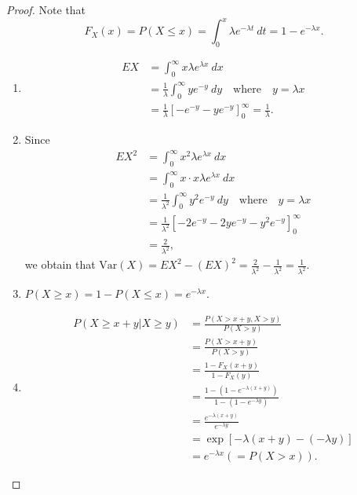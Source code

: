 \documentclass[12pt,a4paper]{article}
\theoremstyle{definition}
\theoremstyle{definition}
\theoremstyle{definition}
\theoremstyle{definition}
\theoremstyle{remark}
\theoremstyle{definition}
\newcommand{\dispsty}{\displaystyle}
\newcommand{\Var}{\text{Var}}
\begin{document}
\begin{proof}
	Note that \[
	F_X(x)=P(X\leq x)=\int_0^x\lambda e^{-\lambda t}\ dt=1-e^{-\lambda x}.
	\] \begin{enumerate}
		\item \begin{align*}
		EX&=\int_0^\infty x\lambda e^{\lambda x}\ dx\\
		&=\frac{1}{\lambda}\int_0^\infty ye^{-y}\ dy\quad\text{where}\quad y=\lambda x\\
		&=\frac{1}{\lambda}\left[-e^{-y}-ye^{-y}\right]_0^\infty=\frac{1}{\lambda}.
		\end{align*}
		\item Since \begin{align*}
		EX^2&=\int_0^\infty x^2\lambda e^{\lambda x}\ dx\\
		&=\int_0^\infty x\cdot x\lambda e^{\lambda x}\ dx \\
		&=\frac{1}{\lambda^2}\int_0^\infty y^2e^{-y}\ dy\quad\text{where}\quad y=\lambda x\\
		&=\frac{1}{\lambda^2}\left[-2e^{-y}-2ye^{-y}-y^2e^{-y}\right]_0^\infty\\
		&=\frac{2}{\lambda^2},
		\end{align*} we obtain that $\Var(X)=EX^2-(EX)^2=\dispsty\frac{2}{\lambda^2}-\frac{1}{\lambda^2}=\frac{1}{\lambda^2}$.\\
		\item $\dispsty P(X\geq x)=1-P(X\leq x)=e^{-\lambda x}$.\\
		\item \begin{align*}
		P(X\geq x+y|X\geq y)&=\frac{P(X>x+y,X>y)}{P(X>y)}\\
		&=\frac{P(X>x+y)}{P(X>y)}\\
		&=\frac{1-F_X(x+y)}{1-F_X(y)}\\
		&=\frac{1-(1-e^{-\lambda(x+y)})}{1-(1-e^{-\lambda y})}\\
		&=\frac{e^{-\lambda(x+y)}}{e^{-\lambda y}}\\
		&=\exp\left[-\lambda(x+y)-(-\lambda y)\right]\\
		&=e^{-\lambda x}(=P(X>x)).
		\end{align*}
	\end{enumerate}
\end{proof}
\
\end{document}
